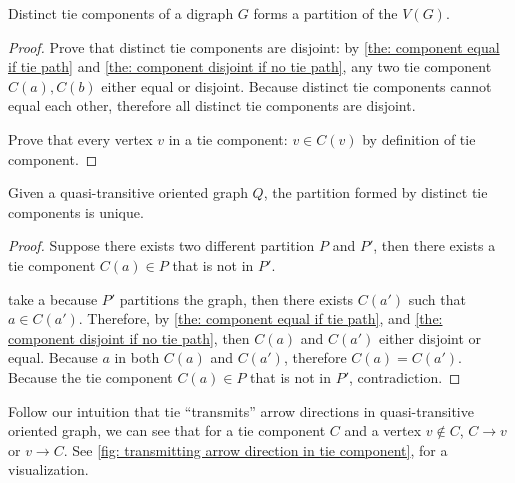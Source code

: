 \begin{theorem}\label{the: tie component partition}
  Distinct tie components of a digraph \(G\) forms a partition
  of the \(V(G)\).
\end{theorem}

\begin{proof}
  Prove that distinct tie components are disjoint:
  by \cref{the: component equal if tie path} and
  \cref{the: component disjoint if no tie path},
  any two tie component \(C(a), C(b)\) either equal or disjoint.
  Because distinct tie components cannot equal each other,
  therefore all distinct tie components are disjoint.

  Prove that every vertex \(v\) in a tie component:
  \(v \in C(v)\) by definition of tie component.
\end{proof}

\begin{theorem}\label{the: tie components partition unique}
  Given a quasi-transitive oriented graph \(Q\),
  the partition formed by distinct tie components is unique.
\end{theorem}

\begin{proof}
  Suppose there exists two different partition \(P\) and \(P'\),
  then there exists a tie component \(C(a) \in P\) that is
  not in \(P'\).

  take a because \(P'\) partitions the graph,
  then there exists \(C(a')\) such that \(a \in C(a')\).
  Therefore, by \cref{the: component equal if tie path},
  and \cref{the: component disjoint if no tie path},
  then \(C(a)\) and \(C(a')\) either disjoint or equal.
  Because \(a\) in both \(C(a)\) and \(C(a')\),
  therefore \(C(a) = C(a')\).
  Because the tie component \(C(a) \in P\) that is
  not in \(P'\), contradiction.
\end{proof}

Follow our intuition that tie ``transmits'' arrow directions
in quasi-transitive oriented graph,
we can see that for a tie component \(C\)
and a vertex \(v \notin C\), \(C \to v\) or \(v \to C\).
See \cref{fig: transmitting arrow direction in tie component},
for a visualization.

